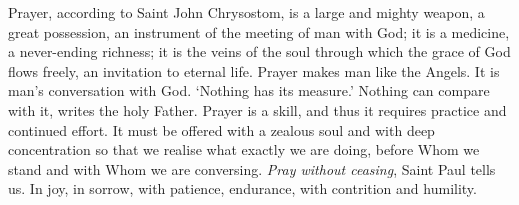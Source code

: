 \vspace{2.2em}
\begingroup
\leftskip=2mm \rightskip=2mm

Prayer, according to Saint John Chrysostom, is a large and mighty weapon, a great possession, an instrument of the meeting of man with God; it is a medicine, a never-ending richness; it is the veins of the soul through which the grace of God flows freely, an invitation to eternal life. Prayer makes man like the Angels. It is man's conversation with God. `Nothing has its measure.' Nothing can compare with it, writes the holy Father. Prayer is a skill, and thus it requires practice and continued effort. It must be offered with a zealous soul and with deep concentration so that we realise what exactly we are doing, before Whom we stand and with Whom we are conversing. \textit{Pray without ceasing}, Saint Paul tells us. In joy, in sorrow, with patience, endurance, with contrition and humility.

\endgroup
